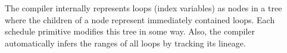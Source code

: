 The compiler internally represents loops (index variables) 
as nodes in a tree where the children
of a node represent immediately contained loops. Each schedule 
primitive modifies this tree in some way. Also, the compiler 
automatically infers the ranges of all loops by tracking
its lineage.


